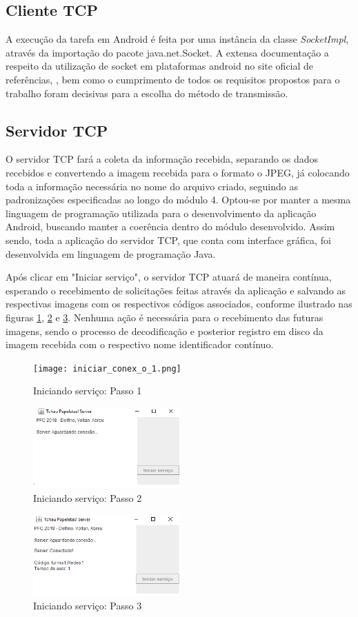 \subsection{Cliente TCP}
A execução da tarefa em Android é feita por uma instância da classe \textit{SocketImpl}, através da importação do pacote java.net.Socket. A extensa documentação a respeito da utilização de socket em plataformas android no site oficial de referências, \citep{Android10},  bem como o cumprimento de todos os requisitos propostos para o trabalho foram decisivas para a escolha do método de transmissão.


\subsection{Servidor TCP}
O servidor TCP fará a coleta da informação recebida, separando os dados recebidos e convertendo a imagem recebida para o formato o JPEG, já colocando toda a informação necessária no nome do arquivo criado, seguindo as padronizações especificadas ao longo do módulo 4. 
Optou-se por manter a mesma linguagem de programação utilizada para o desenvolvimento da aplicação Android, buscando manter a coerência dentro do módulo desenvolvido. Assim sendo, toda a aplicação do servidor TCP, que conta com interface gráfica, foi desenvolvida em linguagem de programação Java.

Após clicar em "Iniciar serviço", o servidor TCP atuará de maneira contínua, esperando o recebimento de solicitações feitas através da aplicação e salvando as respectivas imagens com os respectivos códigos associados, conforme ilustrado nas figuras \ref{fig:figura77}, \ref{fig:figura78} e \ref{fig:figura79}. Nenhuma ação é necessária para o recebimento das futuras imagens, sendo o processo de decodificação e posterior registro em disco da imagem recebida com o respectivo nome identificador contínuo.

\begin{figure}[!ht]
	\centering
\texttt{[image: iniciar\_conex\_o\_1.png]}   
	\caption{Iniciando serviço: Passo 1}

	\label{fig:figura77}
\end{figure}
\begin{figure}[!ht]
	\centering
\includegraphics[width=0.5\textwidth]{img/iniciar_conex_o_2.png}   
	\caption{Iniciando serviço: Passo 2}
	\label{fig:figura78}
\end{figure}

\begin{figure}[!ht]
	\centering
\includegraphics[width=0.5\textwidth]{img/iniciar_conex_o_3.png}   
	\caption{Iniciando serviço: Passo 3}
	\label{fig:figura79}
\end{figure}

\noindent 
